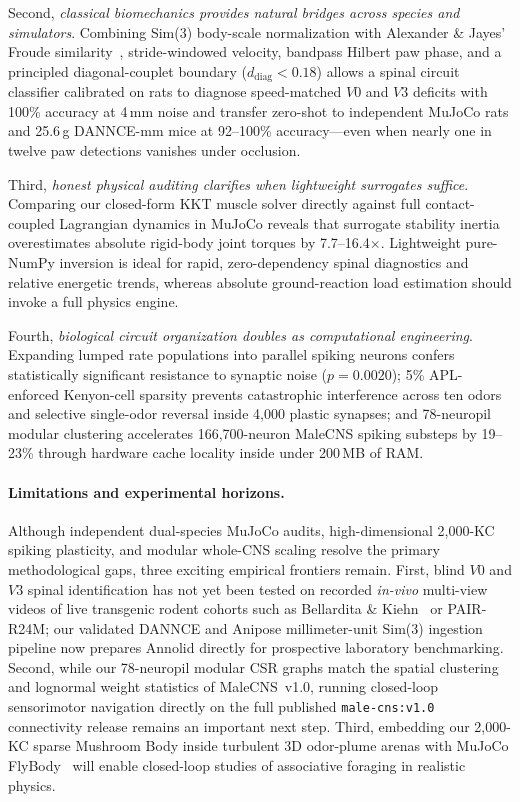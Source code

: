 \documentclass[10pt,twocolumn,letterpaper]{article}
\begin{document}
Second, \emph{classical biomechanics provides natural bridges across species and simulators}. Combining Sim(3) body-scale normalization with Alexander \& Jayes' Froude similarity~\cite{alexander1983froude}, stride-windowed velocity, bandpass Hilbert paw phase, and a principled diagonal-couplet boundary ($d_{\mathrm{diag}}<0.18$) allows a spinal circuit classifier calibrated on rats to diagnose speed-matched $V0$ and $V3$ deficits with 100\% accuracy at 4\,mm noise and transfer zero-shot to independent MuJoCo rats and 25.6\,g DANNCE-mm mice at 92--100\% accuracy---even when nearly one in twelve paw detections vanishes under occlusion.

Third, \emph{honest physical auditing clarifies when lightweight surrogates suffice}. Comparing our closed-form KKT muscle solver directly against full contact-coupled Lagrangian dynamics in MuJoCo reveals that surrogate stability inertia overestimates absolute rigid-body joint torques by 7.7--16.4$\times$. Lightweight pure-NumPy inversion is ideal for rapid, zero-dependency spinal diagnostics and relative energetic trends, whereas absolute ground-reaction load estimation should invoke a full physics engine.

Fourth, \emph{biological circuit organization doubles as computational engineering}. Expanding lumped rate populations into parallel spiking neurons confers statistically significant resistance to synaptic noise ($p=0.0020$); 5\% APL-enforced Kenyon-cell sparsity prevents catastrophic interference across ten odors and selective single-odor reversal inside 4,000 plastic synapses; and 78-neuropil modular clustering accelerates 166,700-neuron MaleCNS spiking substeps by 19--23\% through hardware cache locality inside under 200\,MB of RAM.

\paragraph{Limitations and experimental horizons.}
Although independent dual-species MuJoCo audits, high-dimensional 2,000-KC spiking plasticity, and modular whole-CNS scaling resolve the primary methodological gaps, three exciting empirical frontiers remain. First, blind $V0$ and $V3$ spinal identification has not yet been tested on recorded \emph{in-vivo} multi-view videos of live transgenic rodent cohorts such as Bellardita \& Kiehn~\cite{bellardita2015v0} or PAIR-R24M; our validated DANNCE and Anipose millimeter-unit Sim(3) ingestion pipeline now prepares Annolid directly for prospective laboratory benchmarking. Second, while our 78-neuropil modular CSR graphs match the spatial clustering and lognormal weight statistics of MaleCNS~v1.0, running closed-loop sensorimotor navigation directly on the full published \texttt{male-cns:v1.0} connectivity release remains an important next step. Third, embedding our 2,000-KC sparse Mushroom Body inside turbulent 3D odor-plume arenas with MuJoCo FlyBody~\cite{vaxenburg2025flybody} will enable closed-loop studies of associative foraging in realistic physics.
\end{document}
